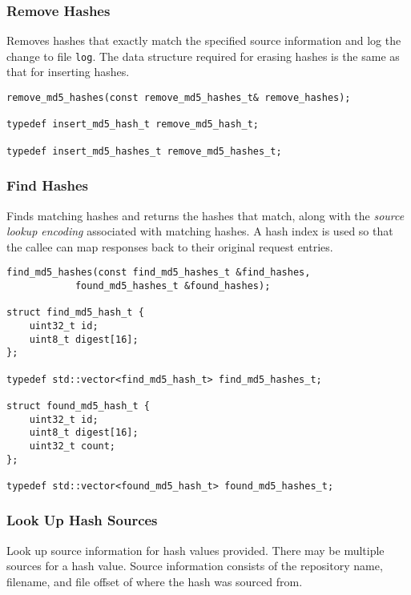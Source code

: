 \documentclass[12pt,twoside]{article}
\begin{document}
\subsubsection{Remove Hashes}
Removes hashes that exactly match the specified source information
and log the change to file \texttt{log}.
The data structure required for erasing hashes
is the same as that for inserting hashes.

\begin{small}
\begin{verbatim}
remove_md5_hashes(const remove_md5_hashes_t& remove_hashes);

typedef insert_md5_hash_t remove_md5_hash_t;

typedef insert_md5_hashes_t remove_md5_hashes_t;
\end{verbatim}
\end{small}

\subsubsection{Find Hashes}
Finds matching hashes and returns the hashes that match,
along with the \emph{source lookup encoding}
associated with matching hashes.
A hash index is used so that the callee can map responses back
to their original request entries.

\begin{small}
\begin{verbatim}
find_md5_hashes(const find_md5_hashes_t &find_hashes,
            found_md5_hashes_t &found_hashes);

struct find_md5_hash_t {
    uint32_t id;
    uint8_t digest[16];
};

typedef std::vector<find_md5_hash_t> find_md5_hashes_t;

struct found_md5_hash_t {
    uint32_t id;
    uint8_t digest[16];
    uint32_t count;
};

typedef std::vector<found_md5_hash_t> found_md5_hashes_t;
\end{verbatim}
\end{small}

\subsubsection{Look Up Hash Sources}
Look up source information for hash values provided.
There may be multiple sources for a hash value.
Source information consists of the repository name, filename, and file offset
of where the hash was sourced from.
\end{document}
